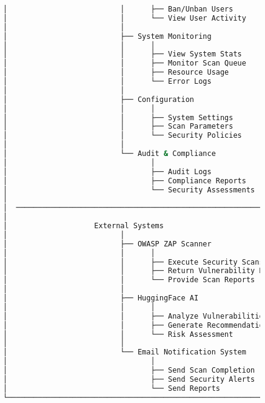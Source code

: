 \documentclass[main.tex]{subfiles}
\begin{document}
\begin{figure}[h]
\begin{lstlisting}[language=bash, caption=WebSecPen системийн Use Case диаграм]
│                          │      ├── Ban/Unban Users            │
│                          │      └── View User Activity         │
│                          │                                      │
│                          ├── System Monitoring                 │
│                          │      │                              │
│                          │      ├── View System Stats          │
│                          │      ├── Monitor Scan Queue         │
│                          │      ├── Resource Usage             │
│                          │      └── Error Logs                 │
│                          │                                      │
│                          ├── Configuration                     │
│                          │      │                              │
│                          │      ├── System Settings            │
│                          │      ├── Scan Parameters            │
│                          │      └── Security Policies          │
│                          │                                      │
│                          └── Audit & Compliance                │
│                                 │                              │
│                                 ├── Audit Logs                 │
│                                 ├── Compliance Reports         │
│                                 └── Security Assessments       │
│                                                                 │
│  ─────────────────────────────────────────────────────────────  │
│                                                                 │
│                    External Systems                             │
│                          │                                      │
│                          ├── OWASP ZAP Scanner                 │
│                          │      │                              │
│                          │      ├── Execute Security Scans     │
│                          │      ├── Return Vulnerability Data  │
│                          │      └── Provide Scan Reports       │
│                          │                                      │
│                          ├── HuggingFace AI                    │
│                          │      │                              │
│                          │      ├── Analyze Vulnerabilities    │
│                          │      ├── Generate Recommendations   │
│                          │      └── Risk Assessment            │
│                          │                                      │
│                          └── Email Notification System         │
│                                 │                              │
│                                 ├── Send Scan Completion       │
│                                 ├── Send Security Alerts       │
│                                 └── Send Reports               │
└─────────────────────────────────────────────────────────────────┘
\end{lstlisting}
\end{figure}
\end{document}
